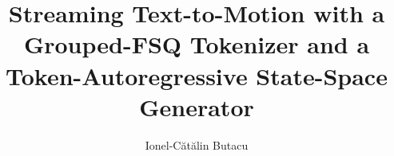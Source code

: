 \documentclass[a4paper,11pt]{scrreprt}  %
\def \chapters {./chapters}      														 %
\begin{document}

\title{Streaming Text-to-Motion with a Grouped-FSQ Tokenizer and a Token-Autoregressive State-Space Generator}
\author{Ionel-Cătălin Butacu}	 %

\maket



\renewcommand*\contentsname{Contents}
\tableofcontents
\printglossaries

\clearpage












\cleardoublepage
\printbibliography
\end{document}
